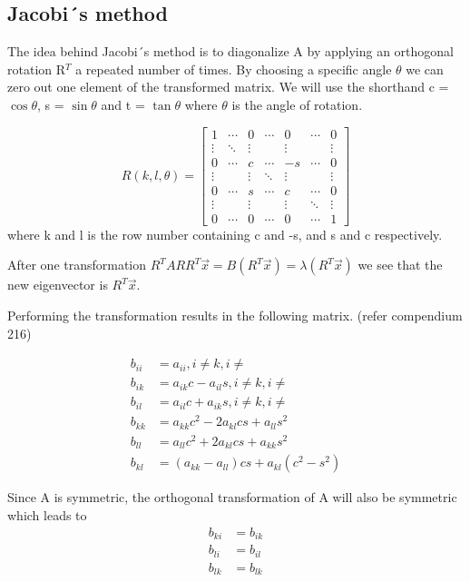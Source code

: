 \subsection{Jacobi´s method}

The idea behind Jacobi´s method is to diagonalize A by applying an orthogonal
rotation R$^T$ a repeated number of times. By choosing a specific angle $\theta$
we can zero out one element of the transformed matrix. We will use the shorthand
c = $\cos{\theta}$, s = $\sin{\theta}$ and t = $\tan{\theta}$ where $\theta$ is
the angle of rotation.


$$R(k,l,\theta) =
\begin{bmatrix}
  1       & \cdots  & 0       & \cdots  & 0       & \cdots  & 0 \\
  \vdots  & \ddots  &  \vdots &         & \vdots  &         & \vdots \\
  0       & \cdots  & c       & \cdots  & -s      & \cdots  & 0 \\
  \vdots  &         & \vdots  & \ddots  & \vdots  &         & \vdots\\
  0       & \cdots  & s       & \cdots  & c       & \cdots  & 0\\
  \vdots  &         & \vdots  &         &  \vdots & \ddots  & \vdots\\
  0       & \cdots  & 0       & \cdots  & 0       & \cdots  & 1
\end{bmatrix}
$$
where k and l is the row number containing c and -s, and s and c respectively.


After one transformation $R^T A R R^T \vec{x} = B (R^T \vec{x}) = \lambda (R^T
\vec{x})$ we see that the new eigenvector is $R^T\vec{x}$.

Performing the transformation results in the following matrix.
(refer compendium 216)

\begin{align}
  b_{ii} &= a_{ii}, i \neq k, i \neq \\
  b_{ik} &= a_{ik}c - a_{il}s, i \neq k, i \neq \\
  b_{il} &= a_{il}c + a_{ik}s, i \neq k, i \neq \\
  b_{kk} &= a_{kk}c^2 - 2a_{kl}cs + a_{ll}s^2 \\
  b_{ll} &= a_{ll}c^2 + 2a_{kl}cs + a_{kk}s^2 \\
  b_{kl} &= (a_{kk}- a_{ll})cs + a_{kl}(c^2 - s^2)
\end{align}

Since A is symmetric, the orthogonal transformation of A will also be symmetric
which leads to
\begin{align}
  b_{ki} &= b_{ik} \\
  b_{li} &= b_{il} \\
  b_{lk} &= b_{lk}
\end{align}

